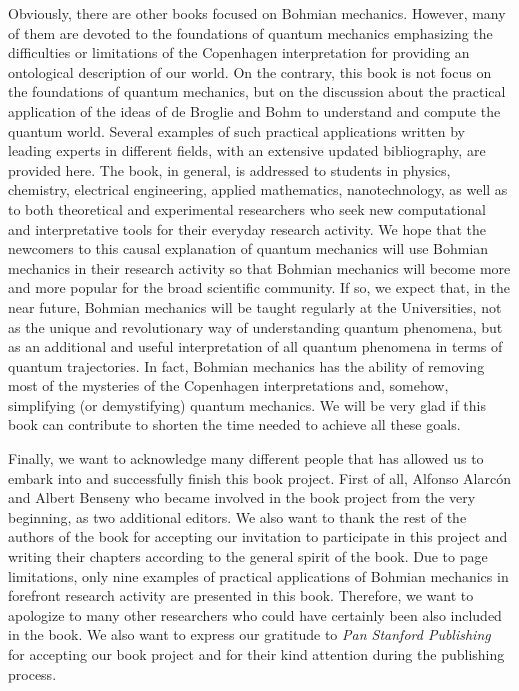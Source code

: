 \documentclass[nofootinbib, secnumarabic, amsmath, nobibnotes,11pt,aps,pra, floatfix]{revtex4-1}
\begin{document}
Obviously, there are other books focused on Bohmian mechanics. However, many of them are devoted to the foundations of quantum mechanics emphasizing the difficulties or limitations of the Copenhagen interpretation for providing an ontological description of our world. On the contrary, this book is not focus on the foundations of quantum mechanics, but on the discussion about the practical application of the ideas of de Broglie and Bohm to understand and compute the quantum world. Several examples of such practical applications written by leading experts in different fields, with an extensive updated bibliography, are provided here. The book, in general, is addressed to students in physics, chemistry, electrical engineering, applied mathematics, nanotechnology, as well as to both theoretical and experimental researchers who seek new computational and interpretative tools for their everyday research activity. We hope that the newcomers to this causal explanation of quantum mechanics will use Bohmian mechanics in their research activity so that Bohmian mechanics will become more and more popular for the broad scientific community. If so, we expect that, in the near future, Bohmian mechanics will be taught regularly at the Universities, not as the unique and revolutionary way of understanding quantum phenomena, but as an additional and useful interpretation of all quantum phenomena in terms of quantum trajectories. In fact, Bohmian mechanics has the ability of removing most of the mysteries of the Copenhagen interpretations and, somehow, simplifying (or demystifying) quantum mechanics. We will be very glad if this book can contribute to shorten the time needed to achieve all these goals.

Finally, we want to acknowledge many different people that has allowed us to embark into and successfully finish this book project. First of all, Alfonso Alarc\'on and Albert Benseny who became involved in the book project from the very beginning, as two additional editors. We also want to thank the rest of the authors of the book for accepting our invitation to participate in this project and writing their chapters according to the general spirit of the book. Due to page limitations, only nine examples of practical applications of Bohmian mechanics in forefront research activity are presented in this book. Therefore, we want to apologize to many other researchers who could have certainly been also included in the book. We also want to express our gratitude to \emph{Pan Stanford Publishing} for accepting our book project and for their kind attention during the publishing process.
\end{document}
